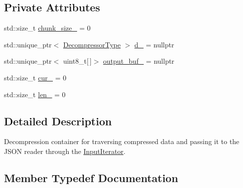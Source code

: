 \subsection*{Private Attributes}
\begin{DoxyCompactItemize}
\item 
std\+::size\+\_\+t \hyperlink{structvt_1_1util_1_1json_1_1_decompression_input_container_a7d9641c3df3cf752ba8f9724ae8f14c7}{chunk\+\_\+size\+\_\+} = 0
\item 
std\+::unique\+\_\+ptr$<$ \hyperlink{structvt_1_1util_1_1json_1_1_decompression_input_container_acb359b166e7b6db21c74da16d8207ef4}{Decompressor\+Type} $>$ \hyperlink{structvt_1_1util_1_1json_1_1_decompression_input_container_a2798121aebac93d48b7d01e3950091d5}{d\+\_\+} = nullptr
\item 
std\+::unique\+\_\+ptr$<$ uint8\+\_\+t\mbox{[}$\,$\mbox{]}$>$ \hyperlink{structvt_1_1util_1_1json_1_1_decompression_input_container_ae759b03218d7920730b28aafedf1b706}{output\+\_\+buf\+\_\+} = nullptr
\item 
std\+::size\+\_\+t \hyperlink{structvt_1_1util_1_1json_1_1_decompression_input_container_aba55d6a79bffddcb9f80b8426e49ec48}{cur\+\_\+} = 0
\item 
std\+::size\+\_\+t \hyperlink{structvt_1_1util_1_1json_1_1_decompression_input_container_ad0debeddc63aad7a8052a7af5a7b2351}{len\+\_\+} = 0
\end{DoxyCompactItemize}


\subsection{Detailed Description}
Decompression container for traversing compressed data and passing it to the J\+S\+ON reader through the {\ttfamily \hyperlink{structvt_1_1util_1_1json_1_1_input_iterator}{Input\+Iterator}}. 

\subsection{Member Typedef Documentation}
\mbox{\label{structvt_1_1util_1_1json_1_1_decompression_input_container_a9e2a25dd33b20d6c2fcdb356a19f2dbb}} 
